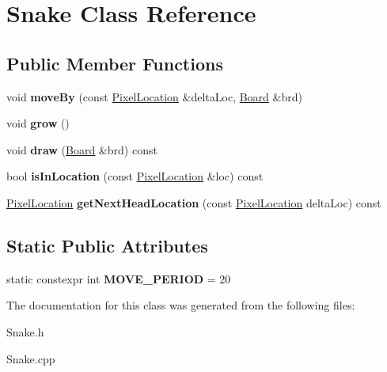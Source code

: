 \hypertarget{class_snake}{}\section{Snake Class Reference}
\label{class_snake}
\subsection*{Public Member Functions}
\begin{DoxyCompactItemize}
\item 
\mbox{\label{class_snake_a956bd91b03fb8c0bb2a8787ba653cf8d}} 
void {\bfseries move\+By} (const \hyperlink{class_pixel_location}{Pixel\+Location} \&delta\+Loc, \hyperlink{class_board}{Board} \&brd)
\item 
\mbox{\label{class_snake_a959eeb2c461a36a9e51de931d6917a75}} 
void {\bfseries grow} ()
\item 
\mbox{\label{class_snake_adc3035ef6074a4cc8467f36836f8fcfc}} 
void {\bfseries draw} (\hyperlink{class_board}{Board} \&brd) const
\item 
\mbox{\label{class_snake_a71d9b9edb90aab30269a0fae800a325f}} 
bool {\bfseries is\+In\+Location} (const \hyperlink{class_pixel_location}{Pixel\+Location} \&loc) const
\item 
\mbox{\label{class_snake_a470d6d5c440ab7b1261977abeddcbb08}} 
\hyperlink{class_pixel_location}{Pixel\+Location} {\bfseries get\+Next\+Head\+Location} (const \hyperlink{class_pixel_location}{Pixel\+Location} delta\+Loc) const
\end{DoxyCompactItemize}
\subsection*{Static Public Attributes}
\begin{DoxyCompactItemize}
\item 
\mbox{\label{class_snake_a53b9c54b0a9f2e07eee5d06b481839f7}} 
static constexpr int {\bfseries M\+O\+V\+E\+\_\+\+P\+E\+R\+I\+OD} = 20
\end{DoxyCompactItemize}


The documentation for this class was generated from the following files\+:\begin{DoxyCompactItemize}
\item 
Snake.\+h\item 
Snake.\+cpp\end{DoxyCompactItemize}
